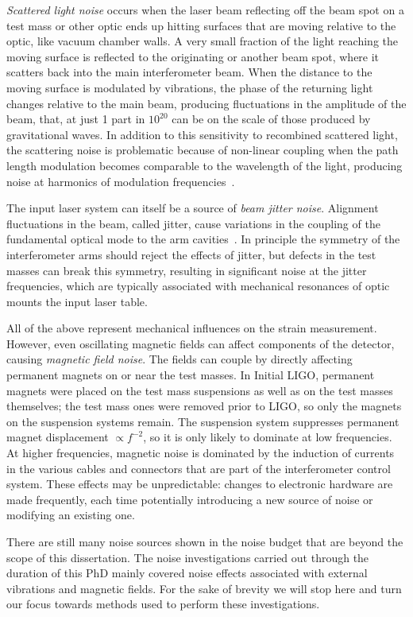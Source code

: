 \textit{Scattered light noise} occurs when the laser beam reflecting off the beam spot on a test mass or other optic ends up hitting surfaces that are moving relative to the optic, like vacuum chamber walls.
A very small fraction of the light reaching the moving surface is reflected to the originating or another beam spot, where it scatters back into the main interferometer beam.
When the distance to the moving surface is modulated by vibrations, the phase of the returning light changes relative to the main beam, producing fluctuations in the amplitude of the beam, that, at just 1 part in $10^{20}$ can be on the scale of those produced by gravitational waves.
In addition to this sensitivity to recombined scattered light, the scattering noise is problematic because of non-linear coupling when the path length modulation becomes comparable to the wavelength of the light, producing noise at harmonics of modulation frequencies~\citep{Soni_2020}.

The input laser system can itself be a source of \textit{beam jitter noise}.
Alignment fluctuations in the beam, called jitter, cause variations in the coupling of the fundamental optical mode to the arm cavities~\citep{Mueller_2005, Hardwick_2019}.
In principle the symmetry of the interferometer arms should reject the effects of jitter, but defects in the test masses can break this symmetry, resulting in significant noise at the jitter frequencies, which are typically associated with mechanical resonances of optic mounts the input laser table.

All of the above represent mechanical influences on the strain measurement.
However, even oscillating magnetic fields can affect components of the detector, causing \textit{magnetic field noise}.
The fields can couple by directly affecting permanent magnets on or near the test masses.
In Initial LIGO, permanent magnets were placed on the test mass suspensions as well as on the test masses themselves; the test mass ones were removed prior to \ac{LIGO}, so only the magnets on the suspension systems remain.
The suspension system suppresses permanent magnet displacement $\propto f^{-2}$, so it is only likely to dominate at low frequencies.
At higher frequencies, magnetic noise is dominated by the induction of currents in the various cables and connectors that are part of the interferometer control system.
These effects may be unpredictable: changes to electronic hardware are made frequently, each time potentially introducing a new source of noise or modifying an existing one.

There are still many noise sources shown in the noise budget that are beyond the scope of this dissertation.
The noise investigations carried out through the duration of this PhD mainly covered noise effects associated with external vibrations and magnetic fields.
For the sake of brevity we will stop here and turn our focus towards methods used to perform these investigations.
